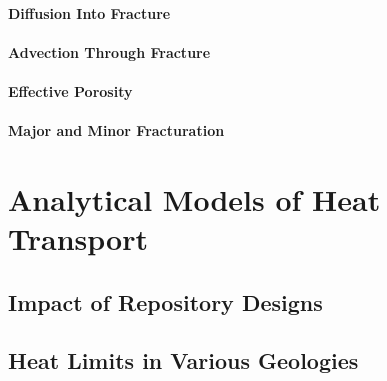% 
%  
% 




\paragraph{Diffusion Into Fracture}

\paragraph{Advection Through Fracture}

\paragraph{Effective Porosity}

\paragraph{Major and Minor Fracturation}











\section{Analytical Models of Heat Transport}\label{sec:analytical_heat}

\subsection{Impact of Repository Designs}

\subsection{Heat Limits in Various Geologies}

